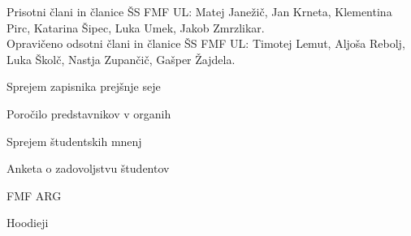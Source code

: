 \documentclass{seja}
\begin{document}
Prisotni člani in članice ŠS FMF UL:
Matej Janežič,
Jan Krneta,
Klementina Pirc,
Katarina Šipec,
Luka Umek,
Jakob Zmrzlikar.
\\
Opravičeno odsotni člani in članice ŠS FMF UL: Timotej Lemut, Aljoša Rebolj, Luka Školč, Nastja Zupančič, Gašper Žajdela.

\begin{red*}
	\item
	Sprejem zapisnika prejšnje seje
	\item
	Poročilo predstavnikov v organih
    \item
    Sprejem študentskih mnenj
    \item
    Anketa o zadovoljstvu študentov
    \item
    FMF ARG
    \item
    Hoodieji
\end{red*}
\end{document}
